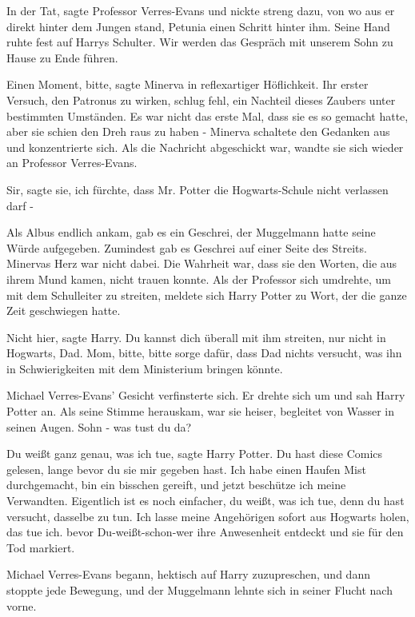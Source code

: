 \glqq{}In der Tat\grqq{}, sagte Professor Verres-Evans und nickte streng dazu,
von wo aus er direkt hinter dem Jungen stand, Petunia einen Schritt hinter ihm.
Seine Hand ruhte fest auf Harrys Schulter. \glqq{}Wir werden das Gespräch mit
unserem Sohn zu Hause zu Ende führen.\grqq{}

\glqq{}Einen Moment, bitte\grqq{}, sagte Minerva in reflexartiger Höflichkeit.
Ihr erster Versuch, den Patronus zu wirken, schlug fehl, ein Nachteil dieses
Zaubers unter bestimmten Umständen. Es war nicht das erste Mal, dass sie es so
gemacht hatte, aber sie schien den Dreh raus zu haben - Minerva schaltete den
Gedanken aus und konzentrierte sich. Als die Nachricht abgeschickt war, wandte
sie sich wieder an Professor Verres-Evans.

\glqq{}Sir\grqq{}, sagte sie, \glqq{}ich fürchte, dass Mr. Potter die
Hogwarts-Schule nicht verlassen darf -\grqq{}

Als Albus endlich ankam, gab es ein Geschrei, der Muggelmann hatte seine Würde
aufgegeben. Zumindest gab es Geschrei auf einer Seite des Streits. Minervas Herz
war nicht dabei. Die Wahrheit war, dass sie den Worten, die aus ihrem Mund
kamen, nicht trauen konnte. Als der Professor sich umdrehte, um mit dem
Schulleiter zu streiten, meldete sich Harry Potter zu Wort, der die ganze Zeit
geschwiegen hatte.

\glqq{}Nicht hier\grqq{}, sagte Harry. \glqq{}Du kannst dich überall mit ihm
streiten, nur nicht in Hogwarts, Dad. Mom, bitte, bitte sorge dafür, dass Dad
nichts versucht, was ihn in Schwierigkeiten mit dem Ministerium bringen
könnte.\grqq{}

Michael Verres-Evans' Gesicht verfinsterte sich. Er drehte sich um und sah Harry
Potter an. Als seine Stimme herauskam, war sie heiser, begleitet von Wasser in
seinen Augen. \glqq{}Sohn - was tust du da?\grqq{}

\glqq{}Du weißt ganz genau, was ich tue\grqq{}, sagte Harry Potter. \glqq{}Du hast
diese Comics gelesen, lange bevor du sie mir gegeben hast. Ich habe einen Haufen
Mist durchgemacht, bin ein bisschen gereift, und jetzt beschütze ich meine
Verwandten. Eigentlich ist es noch einfacher, du weißt, was ich tue, denn du
hast versucht, dasselbe zu tun. Ich lasse meine Angehörigen sofort aus Hogwarts
holen, das tue ich. bevor Du-weißt-schon-wer ihre Anwesenheit entdeckt und sie
für den Tod markiert.\grqq{}

Michael Verres-Evans begann, hektisch auf Harry zuzupreschen, und dann stoppte
jede Bewegung, und der Muggelmann lehnte sich in seiner Flucht nach vorne.

